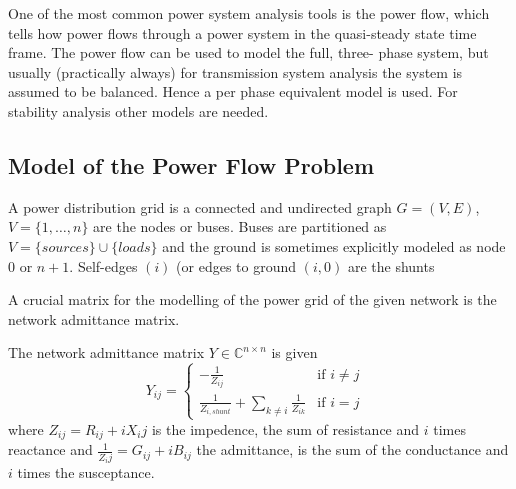 One of the most common power system analysis tools is the power flow, which tells how power flows through a power system in the quasi-steady state time frame. The power flow can be used to model the full, three- phase system, but usually (practically always) for transmission system analysis the system is assumed to be balanced. Hence a per phase equivalent model is used. For stability analysis other models are needed.

\subsection{Model of the Power Flow Problem}

\begin{definition}
A power distribution grid is a connected and undirected graph $G=(V,E)$,
$V=\{1,\dots,n\}$ are the nodes or buses. Buses are partitioned as $V = 
\{sources\} \cup \{loads\}$ and the ground is sometimes explicitly modeled as 
node $0$ or $n+1$. Self-edges $(i)$ (or edges to ground $(i,0)$ are the shunts
\end{definition}

A crucial matrix for the modelling of the power grid of the given network is the network admittance matrix.
\begin{definition}
The network admittance matrix $Y\in\mathbb{C}^{n\times n}$ is given 
\[Y_{ij}=\left\{\begin{matrix}
-\frac{1}{Z_{ij}}& \mbox{if $i\neq j$ }\\
\frac{1}{Z_{i,shunt}} +\sum_{k\neq i}\frac{1}{Z_{ik}}& \mbox{if $i= j$ }
\end{matrix}\right.\]
where $Z_{ij}=R_{ij}+iX_ij$ is the impedence, the sum of resistance and $i$ times reactance 
and $\frac{1}{Z_ij}=G_{ij}+iB_{ij}$ the admittance, is the sum of the conductance and $i$ times the susceptance.
\end{definition}

